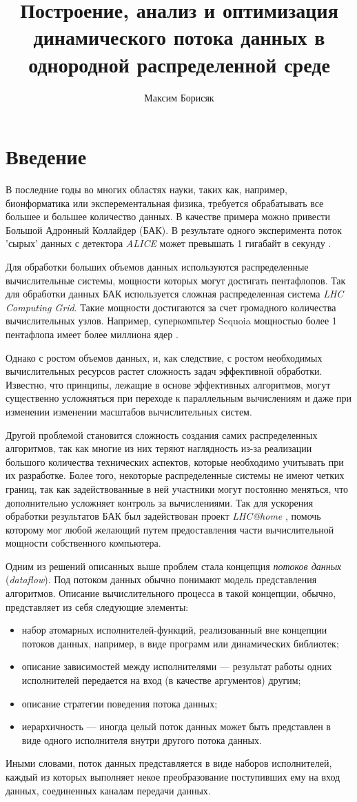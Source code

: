\documentclass[10pt,a4paper]{article}
\author{Максим Борисяк}
\title{Построение, анализ и оптимизация динамического потока данных в однородной распределенной среде}
\begin{document}
\section{Введение}
В последние годы во многих областях науки, таких как, например, бионформатика или эксперементальная физика,
требуется обрабатывать все большее и большее количество данных.
В качестве примера можно привести Большой Адронный Коллайдер (БАК). 
В результате одного эксперимента поток 'сырых' данных с детектора \textit{ALICE} может превышать 1 гигабайт в секунду \cite{lhc-manual}.

Для обработки больших объемов данных используются распределенные вычислительные системы, мощности которых могут достигать пентафлопов.
Так для обработки данных БАК используется сложная распределенная система \textit{LHC Computing Grid}.
Такие мощности достигаются за счет громадного количества вычислительных узлов. Например, суперкомпьтер Sequoia мощностью более 1 пентафлопа
имеет более миллиона ядер \cite{top500}.

Однако с ростом объемов данных, и, как следствие, с ростом необходимых вычислительных ресурсов растет сложность задач эффективной обработки.
Известно, что принципы, лежащие в основе эффективных алгоритмов, могут существенно усложняться при переходе к параллельным вычислениям
и даже при изменении изменении масштабов вычислительных систем.

Другой проблемой становится сложность создания самих распределенных алгоритмов,
так как многие из них теряют наглядность из-за реализации большого количества технических аспектов, которые необходимо учитывать при их разработке.
Более того, некоторые распределенные системы не имеют четких границ, так как задействованные в ней участники могут постоянно меняться,
что дополнительно усложняет контроль за вычислениями.
Так для ускорения обработки результатов БАК был задействован проект \textit{LHC@home} \cite{lhc-home}, помочь которому мог любой желающий путем предоставления части
вычислительной мощности собственного компьютера.

Одним из решений описанных выше проблем стала концепция \textit{потоков данных} (\textit{dataflow}).
Под потоком данных обычно понимают модель представления алгоритмов.
Описание вычислительного процесса в такой концепции, обычно, представляет из себя следующие элементы:
\begin{itemize}
  \item набор атомарных исполнителей-функций, реализованный вне концепции потоков данных, например, в виде программ или динамических библиотек;
  \item описание зависимостей между исполнителями --- результат работы одних исполнителей передается на вход (в качестве аргументов) другим;
  \item описание стратегии поведения потока данных;
  \item иерархичность --- иногда целый поток данных может быть представлен в виде одного исполнителя внутри другого потока данных.
\end{itemize}
Иными словами, поток данных представляется в виде наборов исполнителей, каждый из которых выполняет некое преобразование поступивших ему на вход данных,
соединенных каналам передачи данных.
\end{document}
